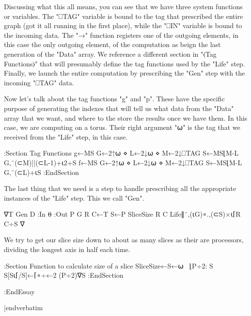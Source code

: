 Discussing what this all means, you can see that we have three system 
functions or variables.  The "⎕TAG" variable is bound to the tag that 
prescribed the entire graph (got it all running in the first place), while 
the "⎕IN" variable is bound to the incoming data.  The "→" function registers 
one of the outgoing elements, in this case the only outgoing element, of the
computation as beign the last generation of the "Data" array.  We reference 
a different section in "⟨Tag Functions⟩" that will presumably define the 
tag functions used by the "Life" step.  Finally, we launch the entire 
computation by prescribing the "Gen" step with the incoming "⎕TAG" data. 

Now let's talk about the tag functions "g" and "p".  These have the specific 
purpose of generating the indexes that will tell us what data from the "Data"
array that we want, and where to the store the results once we have them.
In this case, we are computing on a torus.  Their right argument "⍵" is the 
tag that we received from the "Life" step, in this case.

:Section Tag Functions
 g←{MS G←2↑⍵ ⋄ L←2↓⍵ ⋄ M←2↓⎕TAG
    S←MS⌊M-L
    G,¨(⊂M)||(⊂L-1)+⍳2+S}
 f←{MS G←2↑⍵ ⋄ L←2↓⍵ ⋄ M←2↓⎕TAG
    S←MS⌊M-L
    G,¨(⊂L)+⍳S}
:EndSection

The last thing that we need is a step to handle prescribing all the 
appropriate instances of the "Life" step.  This we call "Gen".

∇T Gen D
 :In ⍬ :Out 
 P G R C←T
 S←P SliceSize R C
 Life∥¨,(⍳G)∘.,(⊂S)×⍳⌈R C÷S
∇

We try to get our slice size down to about as many slices as their are 
processors, dividing the longest axis in half each time.

:Section Function to calculate size of a slice
 SliceSize←{S←⍵
  ~⌊P÷2: S
  S[S⍳⌈/S]←⌈∘÷←2
  (P÷2)∇S} 
:EndSection

:EndEssay

|endverbatim

\bye
